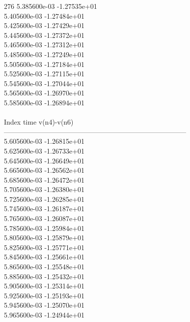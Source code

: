 276	5.385600e-03	-1.27535e+01	\\ 	5.405600e-03	-1.27484e+01	\\ 	5.425600e-03	-1.27429e+01	\\ 	5.445600e-03	-1.27372e+01	\\ 	5.465600e-03	-1.27312e+01	\\ 	5.485600e-03	-1.27249e+01	\\ 	5.505600e-03	-1.27184e+01	\\ 	5.525600e-03	-1.27115e+01	\\ 	5.545600e-03	-1.27044e+01	\\ 	5.565600e-03	-1.26970e+01	\\ 	5.585600e-03	-1.26894e+01	\\ \hline
\\ \hline
Index   time            v(n4)-v(n6)     \\ \hline
--------------------------------------------------------------------------------\\ 	5.605600e-03	-1.26815e+01	\\ 	5.625600e-03	-1.26733e+01	\\ 	5.645600e-03	-1.26649e+01	\\ 	5.665600e-03	-1.26562e+01	\\ 	5.685600e-03	-1.26472e+01	\\ 	5.705600e-03	-1.26380e+01	\\ 	5.725600e-03	-1.26285e+01	\\ 	5.745600e-03	-1.26187e+01	\\ 	5.765600e-03	-1.26087e+01	\\ 	5.785600e-03	-1.25984e+01	\\ 	5.805600e-03	-1.25879e+01	\\ 	5.825600e-03	-1.25771e+01	\\ 	5.845600e-03	-1.25661e+01	\\ 	5.865600e-03	-1.25548e+01	\\ 	5.885600e-03	-1.25432e+01	\\ 	5.905600e-03	-1.25314e+01	\\ 	5.925600e-03	-1.25193e+01	\\ 	5.945600e-03	-1.25070e+01	\\ 	5.965600e-03	-1.24944e+01	\\ \hline
